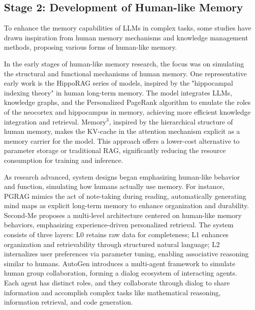 \documentclass[]{memtensor}
\begin{document}
\subsection{Stage 2: Development of Human-like Memory}

To enhance the memory capabilities of LLMs in complex tasks, some studies have drawn inspiration from human memory mechanisms and knowledge management methods, proposing various forms of human-like memory.

In the early stages of human-like memory research, the focus was on simulating the structural and functional mechanisms of human memory.
One representative early work is the HippoRAG series of models\cite{DBLP:conf/nips/GutierrezS0Y024,DBLP:journals/corr/abs-2502-14802}, inspired by the "hippocampal indexing theory" in human long-term memory.
The model integrates LLMs, knowledge graphs, and the Personalized PageRank algorithm to emulate the roles of the neocortex and hippocampus in memory, achieving more efficient knowledge integration and retrieval.
Memory$^3$\cite{memory3_Yang_2024}, inspired by the hierarchical structure of human memory, makes the KV-cache in the attention mechanism explicit as a memory carrier for the model.
This approach offers a lower-cost alternative to parameter storage or traditional RAG, significantly reducing the resource consumption for training and inference.

As research advanced, system designs began emphasizing human-like behavior and function, simulating how humans actually use memory.
For instance, PGRAG\cite{DBLP:journals/corr/abs-2405-16933} mimics the act of note-taking during reading, automatically generating mind maps as explicit long-term memory to enhance organization and durability.
Second-Me\cite{wei2025ainativememory20second} proposes a multi-level architecture centered on human-like memory behaviors, emphasizing experience-driven personalized retrieval.
The system consists of three layers: L0 retains raw data for completeness; L1 enhances organization and retrievability through structured natural language; L2 internalizes user preferences via parameter tuning, enabling associative reasoning similar to humans.
AutoGen\cite{DBLP:journals/corr/abs-2308-08155} introduces a multi-agent framework to simulate human group collaboration, forming a dialog ecosystem of interacting agents.
Each agent has distinct roles, and they collaborate through dialog to share information and accomplish complex tasks like mathematical reasoning, information retrieval, and code generation.
\end{document}
